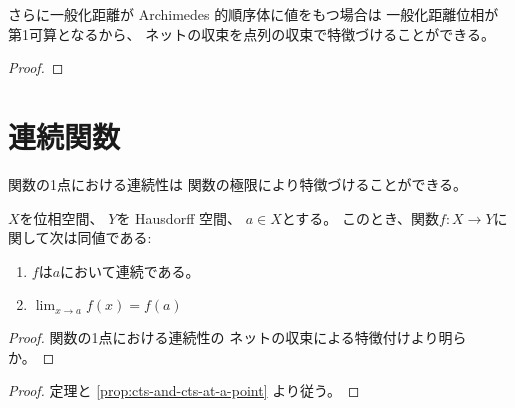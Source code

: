 \documentclass[report]{jlreq}
\begin{document}
さらに一般化距離が Archimedes 的順序体に値をもつ場合は
一般化距離位相が第1可算となるから、
ネットの収束を点列の収束で特徴づけることができる。

\begin{proposition}
    \TODO{}
\end{proposition}

\begin{proof}
    \TODO{}
\end{proof}

%
\section{連続関数}

関数の1点における連続性は
関数の極限により特徴づけることができる。

\begin{theorem}[1点における連続性と関数の極限]
    $X$を位相空間、
    $Y$を Hausdorff 空間、
    $a \in X$とする。
    このとき、関数$f \colon X \to Y$に関して次は同値である:
    \begin{enumerate}
        \item $f$は$a$において連続である。
        \item $\lim_{x \to a} f(x) = f(a)$
    \end{enumerate}
\end{theorem}

\begin{proof}
    関数の1点における連続性の
    ネットの収束による特徴付けより明らか。
\end{proof}


\begin{proof}
    定理と
    \cref{prop:cts-and-cts-at-a-point}
    より従う。
\end{proof}
\end{document}
